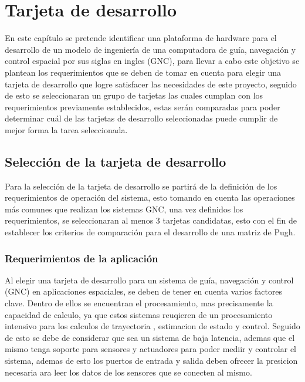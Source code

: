 \chapter{Tarjeta de desarrollo}
\label{ch:especifico1}

En este capítulo se pretende identificar una plataforma de hardware para el desarrollo de un modelo de ingeniería de
una computadora de guía, navegación y control espacial por sus siglas en ingles (GNC), para llevar a cabo este objetivo 
se plantean los requerimientos que se deben de tomar en cuenta para elegir una tarjeta de desarrollo que logre satisfacer
las necesidades de este proyecto, seguido de esto se seleccionaran un grupo de tarjetas las cuales cumplan con los 
requerimientos previamente establecidos, estas serán comparadas para poder determinar cuál de las tarjetas de desarrollo 
seleccionadas puede cumplir de mejor forma la tarea seleccionada.

\section{Selección de la tarjeta de desarrollo}
    Para la selección de la tarjeta de desarrollo se partirá de la definición de los requerimientos de operación del sistema, 
    esto tomando en cuenta las operaciones más comunes que realizan los sistemas GNC, una vez definidos los requerimientos, se 
    seleccionaran al menos 3 tarjetas candidatas, esto con el fin de establecer los criterios de comparación para el desarrollo
    de una matriz de Pugh.

\subsection{Requerimientos de la aplicación}

Al elegir una tarjeta de desarrollo para un sistema de guía, navegación y control (GNC) en aplicaciones espaciales, 
se deben de tener en cuenta varios factores clave. Dentro de ellos se encuentran el procesamiento, mas precisamente
la capacidad de calculo, ya que estos sistemas reuqieren de un procesamiento intensivo para los calculos de trayectoria
, estimacion de estado y control. Seguido de esto se debe de considerar que sea un sistema de baja latencia, ademas que
el mismo tenga soporte para sensores y actuadores para poder mediir y controlar el sistema, ademas de esto los puertos
de entrada y salida deben ofrecer la presicion necesaria ara leer los datos de los sensores que se conecten al mismo.


